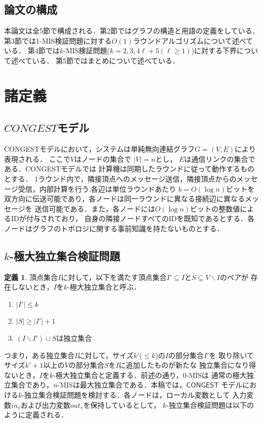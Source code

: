 \documentclass[11pt,a4paper]{jarticle}
\newcommand{\CONGEST}{\textsf{CONGEST}}
\newcommand{\Inp}{\mathit{in}}
\newcommand{\Out}{\mathit{out}}
\theoremstyle{definition}
\newtheorem{definition}{定義}[section]
\begin{document}
\subsection{論文の構成}
本論文は全5節で構成される．第2節ではグラフの構造と用語の定義をしている．
第3節では1-MIS検証問題に対する$O(1)$ラウンドアルゴリズムについて述べている．
第4節では$k$-MIS検証問題($k = 2, 3, 4\ell + 5 (\ell \geq 1)$)に対する下界について述べている．
第5節ではまとめについて述べている．

\section{諸定義}

\subsection{$CONGEST$モデル}
{\CONGEST}モデルにおいて，システムは単純無向連結グラフ$G =  (V,E)$により表現される．
ここで$V$はノードの集合で $|V| = n$とし， $E$は通信リンクの集合である．{\CONGEST}モデルでは
計算機は同期したラウンドに従って動作するものとする．
1ラウンド内で，隣接頂点へのメッセージ送信，隣接頂点からのメッセージ受信，内部計算を行う.各辺は単位ラウンドあたり
$b = O(\log n)$ビットを双方向に伝送可能であり，各ノードは同一ラウンドに異なる接続辺に異なるメッセージを
送信可能である．また，各ノードには$O(\log n)$ビットの整数値によるIDが付与されており，
自身の隣接ノードすべてのIDを既知であるとする．各ノードはグラフのトポロジに関する事前知識を持たないものとする．

\subsection{$k$-極大独立集合検証問題}
\begin{definition}
頂点集合$I$に対して，以下を満たす頂点集合$I' \subseteq I$と$S\subseteq V \backslash I$のペアが
存在しないとき，$I$を$k$-極大独立集合と呼ぶ．
\begin{enumerate}
\item $|I'| \leq k$
\item $|S| \geq |I'| + 1$
\item $(I \backslash I') \cup S$は独立集合
\end{enumerate}
\end{definition}
つまり，ある独立集合$I$に対して，サイズ$k'$($\leq k$)の$I$の部分集合$I'$を
取り除いてサイズ$k' + 1$以上の$V$の部分集合$S$を$I$に追加したものが新たな
独立集合になり得ないとき，$I$を$k$-極大独立集合と定義する．前述の通り，$0$-MISは
通常の極大独立集合であり，$n$-MISは最大独立集合である．本稿では，${\CONGEST}$
モデルにおける$k$-独立集合検証問題を検討する．各ノードは，ローカル変数として
入力変数$\Inp_v$および出力変数$\Out_v$を保持しているとして，
$k$-独立集合検証問題は以下のように定義される．
\end{document}
